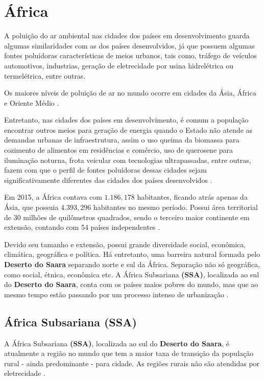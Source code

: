 \section{África}

A poluição do ar ambiental nas cidades dos países em desenvolvimento 
guarda algumas similaridades com as dos países desenvolvidos, já que 
possuem algumas fontes poluídoras características de meios urbanos, 
tais como, tráfego de veículos automotivos, industrias, geração de 
eletrecidade por usina hidrelétrica ou termelétrica, entre outras. 

Os maiores níveis de poluição de ar no mundo ocorre
em cidades da Ásia, África e Oriente Médio \citep{brauer2012}. 

Entretanto, nas cidades dos países em desenvolvimento, é comum 
a população encontrar outros meios para geração de energia quando 
o Estado não atende as demandas urbanas de infraestrutura, assim o 
uso queima da biomassa para cozimento de alimentos em residências 
e comércio, uso de querosene para iluminação noturna, frota veicular
com tecnologias ultrapassadas, entre outras, fazem com que o perfil 
de fontes poluídoras dessas cidades sejam significativamente 
diferentes das cidades dos países desenvolvidos \citep{brauer2012}.

Em 2015, a África contava com $1.186,178$ habitantes, ficando atrás 
apenas da Ásia, que possuia $4.393,296$ habitantes no mesmo período. 
Possui área territorial de 30 milhões de quilômetros quadrados, sendo
o terceiro maior continente em extensão, contando com 54 países 
independentes \citep{UN}.

Devido seu tamanho e extensão, possui grande diversidade social, 
econômica, climática, geográfica e política. 
Há entretanto, uma barreira natural formada pelo \textbf{Deserto do Saara}
separando norte e sul da África. Separação não só geográfica, como
social, étnica, econômica etc. 
A África Subsariana \textbf{(SSA)}, localizada ao sul do \textbf{Deserto do Saara}, 
conta com os países maios pobres do mundo, mas que ao mesmo tempo estão
passando por um processo intenso de urbanização \citep{UN}. 
   	
\subsection{África Subsariana \textbf{(SSA)}}

A África Subsariana \textbf{(SSA)}, localizada ao sul do 
\textbf{Deserto do Saara}, é atualmente a região no mundo que tem a maior 
taxa de transição da população rural - ainda predominante - para cidade. 
As regiões rurais não são atendidas por eletrecidade \citep{MONTGOMERY2008}.

